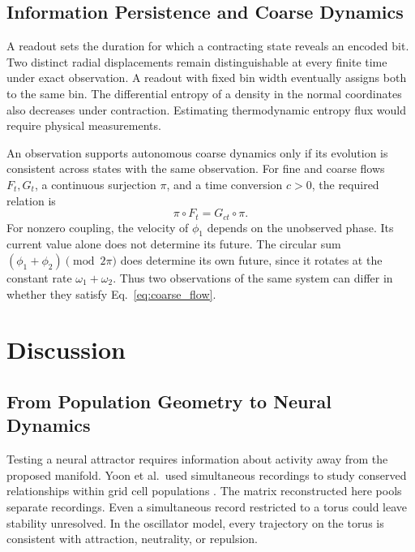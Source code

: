 \documentclass[12pt,a4paper]{article}
\begin{document}
\subsection{Information Persistence and Coarse Dynamics}

A readout sets the duration for which a contracting state reveals an encoded bit. Two distinct radial displacements remain distinguishable at every finite time under exact observation. A readout with fixed bin width eventually assigns both to the same bin. The differential entropy of a density in the normal coordinates also decreases under contraction. Estimating thermodynamic entropy flux would require physical measurements.

An observation supports autonomous coarse dynamics only if its evolution is consistent across states with the same observation. For fine and coarse flows $F_t,G_t$, a continuous surjection $\pi$, and a time conversion $c>0$, the required relation is
\begin{equation}\label{eq:coarse_flow}
 \pi\circ F_t=G_{ct}\circ\pi.
\end{equation}
For nonzero coupling, the velocity of $\phi_1$ depends on the unobserved phase. Its current value alone does not determine its future. The circular sum $(\phi_1+\phi_2)\pmod{2\pi}$ does determine its own future, since it rotates at the constant rate $\omega_1+\omega_2$. Thus two observations of the same system can differ in whether they satisfy Eq.~\eqref{eq:coarse_flow}.

\section{Discussion}\label{sec:discussion}

\subsection{From Population Geometry to Neural Dynamics}\label{sec:trajectory}

Testing a neural attractor requires information about activity away from the proposed manifold. Yoon et al.\ used simultaneous recordings to study conserved relationships within grid cell populations \cite{Yoon2013}. The matrix reconstructed here pools separate recordings. Even a simultaneous record restricted to a torus could leave stability unresolved. In the oscillator model, every trajectory on the torus is consistent with attraction, neutrality, or repulsion.
\end{document}
